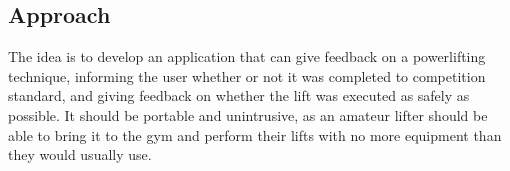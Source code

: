 \subsection{Approach}

The idea is to develop an application that can give feedback on a powerlifting technique, informing the user whether or not it was completed to competition standard, and giving feedback on whether the lift was executed as safely as possible. It should be portable and unintrusive, as an amateur lifter should be able to bring it to the gym and perform their lifts with no more equipment than they would usually use.